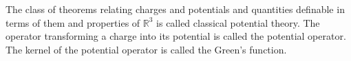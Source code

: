 The class of theorems relating charges and potentials and quantities definable in terms of them and properties of $\mathbb{R}^3$ is called classical potential theory. The operator transforming a charge into its potential is called the potential operator. The kernel of the potential operator is called the Green's function.
